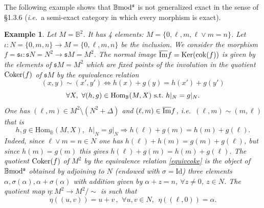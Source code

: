 \documentclass[12pt]{article}
\newtheorem{example}[thm]{Example}
\def\Hom{{\rm Hom}}
\def\id{{\rm id}}
\def\coker{{\rm Coker}}
\def\scoker{{\rm cok}}
\def\B{{\mathbb B}}
\def\imm{\overline{\rm Im}}
\def\qqq{\,,\,~\forall}
\newcommand{\ie}{{\it i.e.\/}\ }
\def\id{{\mbox{Id}}}
\def\ker{{\mbox{Ker}}}
\def\Hom {{\mbox{Hom}}}
\def\yb{\mathfrak{s}}
\def\b2{{\rm \B mod^{\mathfrak s}}}
\begin{document}
The following example shows that $\b2$ is not generalized exact in the sense of \cite{gra} \S 1.3.6 (\ie a semi-exact category in which every morphism is exact). 

 \begin{example}\label{excok}  Let $M=\B^2$. It has 4 elements: $M=\{0,\ell,m,\ell\vee m=n\}$. Let $\iota:N=\{0,m,n\}\to M=\{0,\ell,m,n\}$ be the inclusion.  We consider  the morphism $f=\yb\iota:\yb N=N^2\to \yb M=M^2$.  The normal image  $\imm f=\ker(\scoker(f))$ is given by the elements of $\yb M=M^2$ which are fixed points of the involution in   the quotient $\coker(f)$ of $\yb M$ by the equivalence relation 
 \begin{equation}\label{equivcoke}
(x,y)\sim (x',y')\iff h(x)+g(y)=h(x')+g(y')  \end{equation}
 $$
 \forall X,~\forall (h,g)\in\Hom_\B(M,X)~{\rm s.t.}~ h\vert_N=g\vert_N.
 $$
 One has $(\ell,m)\in M^2\setminus (N^2+\Delta)$ and  $(\ell,m)\in \imm f$, \ie  $(\ell,m)\sim (m,\ell)$ that is 
 $$
h,g \in\Hom_\B(M,X),\ \ h\vert_N=g\vert_N \Rightarrow h(\ell)+g(m)= h(m)+g(\ell).
 $$	
 Indeed,  since $\ell\vee m=n\in N$ one has $h(\ell)+h(m)= g(m)+g(\ell)$, but since $h(m)=g(m)$ this gives $h(\ell)+g(m)= h(m)+g(\ell)$.
 The quotient $\coker(f)$ of $M^2$ by the equivalence relation \eqref{equivcoke} is the object of $\b2$ obtained by adjoining to $N$ (endowed with $\sigma=\id$) three elements $\alpha,\sigma(\alpha), \alpha+\sigma(\alpha)$ with addition given by $\alpha+z=n$, $\forall z\neq 0$, $z\in N$. The quotient map $\eta:M^2\to M^2/\!\!\sim$ is such that 
 $$
 \eta((u,v))=u+v\qqq u,v\in N, \ \ \eta((\ell,0))=\alpha.
 $$
  \end{example}
 
\end{document}
